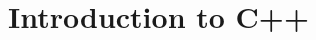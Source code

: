 \chapter{Introduction to C++} \label{ch:CppIntro}


\graphicspath{{Chapters/CppIntro/Figures/}}




